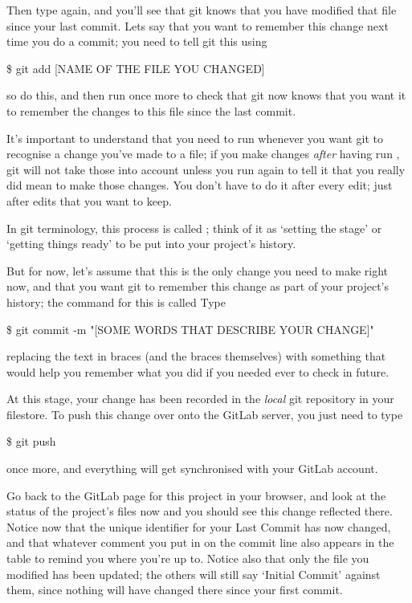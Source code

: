 Then type  again, and you'll see that git knows that you have modified that file since your last commit. Lets say that you want to remember this change next time you do a commit; you need to tell git this using 

\begin{ttoutenv}
\$ git add [NAME OF THE FILE YOU CHANGED]
\end{ttoutenv}

so do this, and then run  once more to check that git now knows that you want it to remember the changes to this file since the last commit. 

It's important to understand that you need to run  whenever you want git to recognise a change you've made to a file; if you make changes \emph{after} having run , git will not take those into account unless you run  again to tell it that you really did mean to make those changes. You don't have to do it after every edit; just after edits that you want to keep. 

In git terminology, this process is called ; think of it as `setting the stage' or `getting things ready' to be put into your project's history. 

But for now, let's assume that this is the only change you need to make right now, and that you want  git to remember this change as part of your project's history; the command for this is called  Type

\begin{ttoutenv}
\$ git commit -m "[SOME WORDS THAT DESCRIBE YOUR CHANGE]"
\end{ttoutenv}

replacing the text in braces (and the braces themselves) with something that would help you remember what you did if you needed ever to check in future. 

At this stage, your change has been recorded in the \emph{local} git repository in your filestore. To push this change over onto the GitLab server, you just need to type

\begin{ttoutenv}
\$ git push
\end{ttoutenv}

once more, and everything will get synchronised with your GitLab account.

Go back to the GitLab page for this project in your browser, and look at the status of the project's files now and you should see this change reflected there. Notice now that the unique identifier for your Last Commit has now changed, and that whatever comment you put in on the commit line also appears in the table to remind you where you're up to. 
Notice also that only the file you modified has been updated; the others will still say `Initial Commit' against them, since nothing will have changed there since your first commit. 

